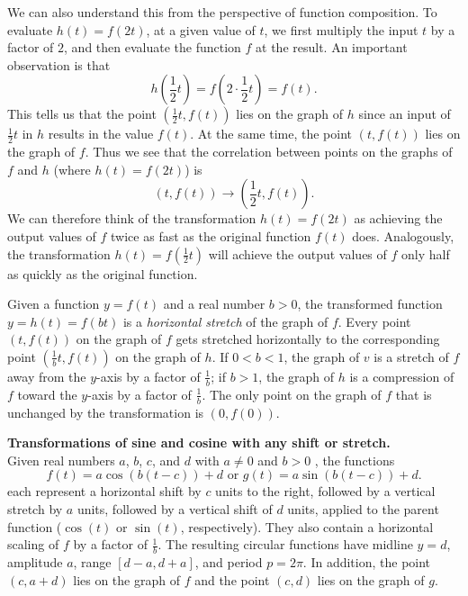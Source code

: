 \documentclass{ximera}
\begin{document}
We can also understand this from the perspective of function composition.  To evaluate \(h(t) = f(2t)\), at a given value of \(t\), we first multiply the input \(t\) by a factor of \(2\), and then evaluate the function \(f\) at the result.  An important observation is that%
\[
h\left( \frac{1}{2}t \right) = f\left( 2 \cdot \frac{1}{2}t \right) = f(t)\text{.}
\]
This tells us that the point \((\frac{1}{2}t, f(t))\) lies on the graph of \(h\) since an input of \(\frac{1}{2}t\) in \(h\) results in the value \(f(t)\).  At the same time, the point \((t,f(t))\) lies on the graph of \(f\).  Thus we see that the correlation between points on the graphs of \(f\) and \(h\) (where \(h(t) = f(2t)\)) is%
\[
(t, f(t)) \rightarrow \left( \frac{1}{2}t, f(t) \right)\text{.}
\]
We can therefore think of the transformation \(h(t) = f(2t)\) as achieving the output values of \(f\) twice as fast as the original function \(f(t)\) does.  Analogously, the transformation \(h(t) = f(\frac{1}{2}t)\) will achieve the output values of \(f\) only half as quickly as the original function.%

Given a function \(y = f(t)\) and a real number \(b \gt 0\), the transformed function \(y = h(t) = f(bt)\) is a \emph{horizontal stretch} of the graph of \(f\).  Every point \((t,f(t))\) on the graph of \(f\) gets stretched horizontally to the corresponding point \((\frac{1}{b}t,f(t))\) on the graph of \(h\).  If \(0 \lt b \lt 1\), the graph of \(v\) is a stretch of \(f\) away from the \(y\)-axis by a factor of \(\frac{1}{b}\); if \(b \gt 1\), the graph of \(h\) is a compression of \(f\) toward the \(y\)-axis by a factor of \(\frac{1}{b}\).  The only point on the graph of \(f\) that is unchanged by the transformation is \((0,f(0))\).%

\begin{callout}
\textbf{Transformations of sine and cosine with any shift or stretch.}\\
Given real numbers \(a\), \(b\), \(c\), and \(d\) with \(a \ne 0\) and \(b \gt 0\) , the functions%
\begin{equation*}
f(t) = a\cos(b(t-c))+d \text{ or } g(t) = a\sin(b(t-c)) + d\text{.}
\end{equation*}
each represent a horizontal shift by \(c\) units to the right, followed by a vertical stretch by \(a\) units, followed by a vertical shift of \(d\) units, applied to the parent function (\(\cos(t)\) or \(\sin(t)\), respectively). They also contain a horizontal scaling of \(f\) by a factor of \(\frac{1}{b}\).  The resulting circular functions have midline \(y = d\), amplitude \(a\), range \([d-a,d+a]\), and period \(p = 2\pi\).  In addition, the point \((c,a+d)\) lies on the graph of \(f\) and the point \((c,d)\) lies on the graph of \(g\).
\end{callout}
\end{document}
